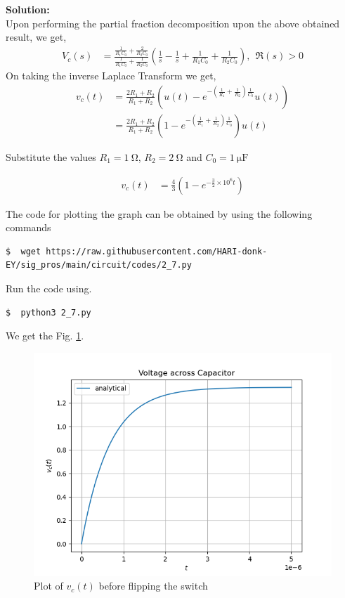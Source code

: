 \documentclass[journal,12pt,twocolumn]{IEEEtran}
\newcommand{\solution}{\noindent \textbf{Solution: }}
\numberwithin{equation}{section}
\numberwithin{figure}{section}
\renewcommand\thesection{\arabic{section}}
\begin{document}
\begin{enumerate}[label=\thesection.\arabic*,ref=\thesection.\theenumi]
		\solution\\
			Upon performing the partial fraction decomposition upon the above obtained result, we get,
			\begin{align}
				V_c(s) & = \frac{\frac{1}{R_1C_0} + \frac{2}{R_2C_0}}{\frac{1}{R_1C_0} + \frac{1}{R_2C_0}}\left( \frac{1}{s} - \frac{1}{s} + \frac{1}{R_1C_0} + \frac{1}{R_2C_0} \right), \ \ \Re(s) > 0
			\end{align}
			On taking the inverse Laplace Transform we get,
			\begin{align}
				v_c(t) & = \frac{2R_1 + R_2}{R_1 + R_2}\left( u(t) - e^{-\left(\frac{1}{R_1} + \frac{1}{R_2}\right)\frac{1}{C_0}}u(t) \right)\\
				& = \frac{2R_1 + R_2}{R_1 + R_2}\left( 1 - e^{-\left(\frac{1}{R_1} + \frac{1}{R_2}\right)\frac{1}{C_0}} \right)u(t)
			\end{align}

			Substitute the values $R_1 = \SI{1}{\ohm}$, $R_2 = \SI{2}{\ohm}$ and $C_0 = \SI{1}{\micro\farad}$

			\begin{align}
				v_c(t) & = \frac{4}{3}\left( 1 - e^{-\frac{3}{2} \times 10^6t} \right)
			\end{align}

			The code for plotting the graph can be obtained by using the following commands

			\begin{lstlisting}
$  wget https://raw.githubusercontent.com/HARI-donk-EY/sig_pros/main/circuit/codes/2_7.py
			\end{lstlisting}

			Run the code using.

			\begin{lstlisting}
$  python3 2_7.py
			\end{lstlisting}

			We get the Fig. \ref{fig:2.7}.

			\begin{figure}[h]
				\begin{center}
					\includegraphics[width=0.7\columnwidth]{figs/2_7}
				\end{center}
				\caption{Plot of $v_c(t)$ before flipping the switch}
				\label{fig:2.7}
			\end{figure}
			

\end{enumerate}
\end{document}

